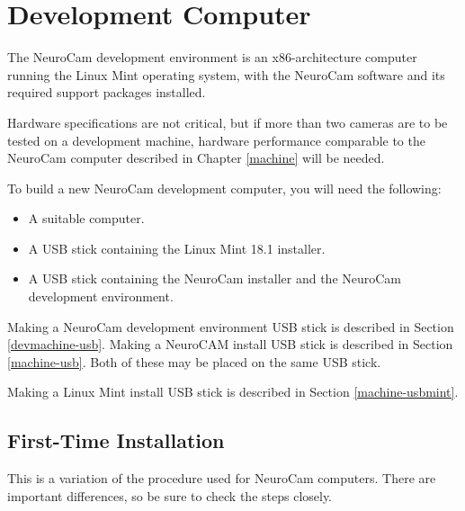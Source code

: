 
\chapter{Development Computer}
\label{devmachine}

The NeuroCam development environment is an x86-architecture computer running
the Linux Mint operating system, with the NeuroCam software and its required
support packages installed.

Hardware specifications are not critical, but if more than two cameras are to
be tested on a development machine, hardware performance comparable to the 
NeuroCam computer described in Chapter \ref{machine} will be needed.

To build a new NeuroCam development computer, you will need the following:
\begin{itemize}
%
\item A suitable computer.
\item A USB stick containing the Linux Mint 18.1 installer.
\item A USB stick containing the NeuroCam installer and the NeuroCam
development environment.
%
\end{itemize}

Making a NeuroCam development environment USB stick is described in Section
\ref{devmachine-usb}. Making a NeuroCAM install USB stick is described in
Section \ref{machine-usb}. Both of these may be placed on the same USB stick.

Making a Linux Mint install USB stick is described in Section
\ref{machine-usbmint}.

%
%
\section{First-Time Installation}

This is a variation of the procedure used for NeuroCam computers. There are
important differences, so be sure to check the steps closely.



